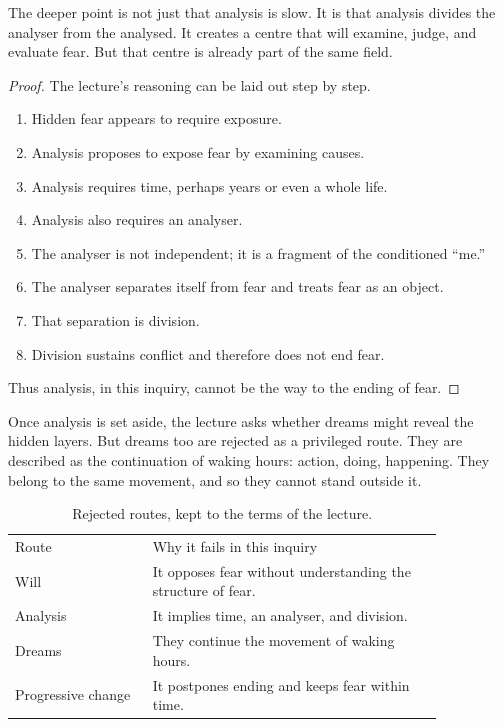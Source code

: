 The deeper point is not just that analysis is slow. It is that analysis divides the analyser from the analysed. It creates a centre that will examine, judge, and evaluate fear. But that centre is already part of the same field.

\begin{proof}
The lecture's reasoning can be laid out step by step.
\begin{enumerate}
\item Hidden fear appears to require exposure.
\item Analysis proposes to expose fear by examining causes.
\item Analysis requires time, perhaps years or even a whole life.
\item Analysis also requires an analyser.
\item The analyser is not independent; it is a fragment of the conditioned ``me.''
\item The analyser separates itself from fear and treats fear as an object.
\item That separation is division.
\item Division sustains conflict and therefore does not end fear.
\end{enumerate}
Thus analysis, in this inquiry, cannot be the way to the ending of fear.
\end{proof}

Once analysis is set aside, the lecture asks whether dreams might reveal the hidden layers. But dreams too are rejected as a privileged route. They are described as the continuation of waking hours: action, doing, happening. They belong to the same movement, and so they cannot stand outside it.

\begin{table}
\centering
\begin{tabular}{p{0.27\linewidth} p{0.58\linewidth}}
Route & Why it fails in this inquiry \\
Will & It opposes fear without understanding the structure of fear. \\
Analysis & It implies time, an analyser, and division. \\
Dreams & They continue the movement of waking hours. \\
Progressive change & It postpones ending and keeps fear within time. \\
\end{tabular}
\caption{Rejected routes, kept to the terms of the lecture.}
\end{table}

